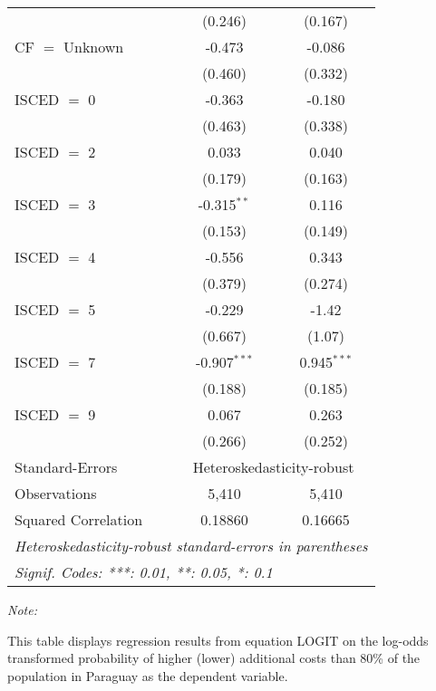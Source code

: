 \begin{table}[htbp!]
\begin{adjustbox}{width = 1\textwidth, max height = 0.95\textheight, center}
\begin{threeparttable}[b]
\begin{tabular}{lcc}
                                 & (0.246)        & (0.167)\\   
            CF $=$ Unknown       & -0.473         & -0.086\\   
                                 & (0.460)        & (0.332)\\   
            ISCED $=$ 0          & -0.363         & -0.180\\   
                                 & (0.463)        & (0.338)\\   
            ISCED $=$ 2          & 0.033          & 0.040\\   
                                 & (0.179)        & (0.163)\\   
            ISCED $=$ 3          & -0.315$^{**}$  & 0.116\\   
                                 & (0.153)        & (0.149)\\   
            ISCED $=$ 4          & -0.556         & 0.343\\   
                                 & (0.379)        & (0.274)\\   
            ISCED $=$ 5          & -0.229         & -1.42\\   
                                 & (0.667)        & (1.07)\\   
            ISCED $=$ 7          & -0.907$^{***}$ & 0.945$^{***}$\\   
                                 & (0.188)        & (0.185)\\   
            ISCED $=$ 9          & 0.067          & 0.263\\   
                                 & (0.266)        & (0.252)\\   
            \midrule 
            Standard-Errors & \multicolumn{2}{c}{Heteroskedasticity-robust} \\ 
            Observations         & 5,410          & 5,410\\  
            Squared Correlation  & 0.18860        & 0.16665\\  
            \midrule \midrule
            \multicolumn{3}{l}{\emph{Heteroskedasticity-robust standard-errors in parentheses}}\\
            \multicolumn{3}{l}{\emph{Signif. Codes: ***: 0.01, **: 0.05, *: 0.1}}\\
         \end{tabular}
         
         \begin{tablenotes}\item \medskip \textit{Note:}
            \item This table displays regression results from equation LOGIT on the log-odds transformed probability of higher (lower) additional costs than 80\% of the population in Paraguay as the dependent variable. 
         \end{tablenotes}
      \end{threeparttable}
   \end{adjustbox}
\end{table}


